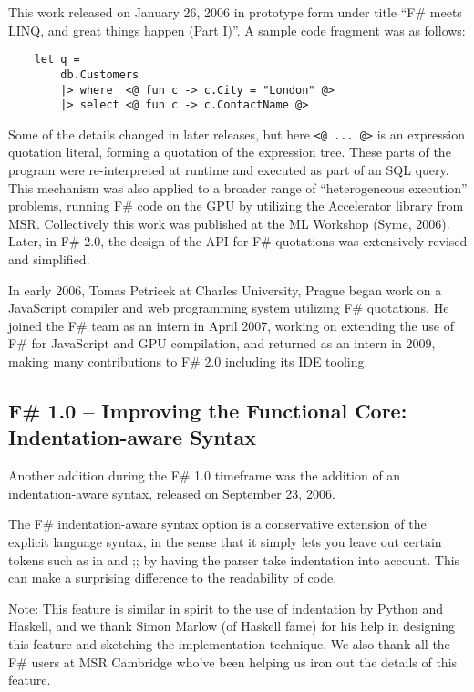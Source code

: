 \documentclass[acmsmall,review]{acmart}\settopmatter{printfolios=true,printccs=false,printacmref=false}
\begin{document}
This work released on January 26, 2006 in prototype form under title “F\# meets LINQ, and great things happen (Part I)”.   A sample code fragment was as follows:

\begin{verbatim}
    let q =
        db.Customers
        |> where  <@ fun c -> c.City = "London" @> 
        |> select <@ fun c -> c.ContactName @>
\end{verbatim}
Some of the details changed in later releases, but here \verb$<@ ... @>$ is an expression quotation literal, forming a quotation of the expression tree. These parts of the program were re-interpreted at runtime and executed as part of an SQL query.  This mechanism was also applied to a broader range of “heterogeneous execution” problems, running F\# code on the GPU by utilizing the Accelerator library from MSR. Collectively this work was published at the ML Workshop (Syme, 2006). Later, in F\# 2.0, the design of the API for F\# quotations was extensively revised and simplified.

In early 2006, Tomas Petricek at Charles University, Prague began work on a JavaScript compiler and web programming system utilizing F\# quotations.   He joined the F\# team as an intern in April 2007, working on extending the use of F\# for JavaScript and GPU compilation, and returned as an intern in 2009, making many contributions to F\# 2.0 including its IDE tooling.

\subsection*{F\# 1.0 – Improving the Functional Core: Indentation-aware Syntax}

Another addition during the F\# 1.0 timeframe was the addition of an indentation-aware syntax, released on September 23, 2006.   

\begin{verbquote}
The F\# indentation-aware syntax option is a conservative extension of the explicit language syntax, in the sense that it simply lets you leave out certain tokens such as in and ;; by having the parser take indentation into account. This can make a surprising difference to the readability of code. 

Note: This feature is similar in spirit to the use of indentation by Python and Haskell, and we thank Simon Marlow (of Haskell fame) for his help in designing this feature and sketching the implementation technique. We also thank all the F\# users at MSR Cambridge who've been helping us iron out the details of this feature. 
\end{verbquote}
\end{document}
